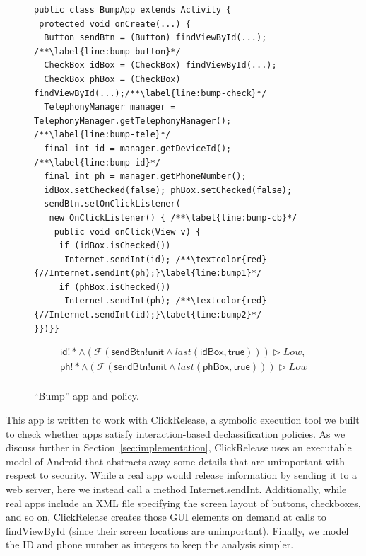 \documentclass{llncs}
\newcommand{\code}[1]{\textsf{#1}} %
\newcommand{\toolname}{ClickRelease\xspace}
\newcommand{\tfuture}{\mathcal{F}}
\newcommand{\tlast}[2]{\textit{last}(#1, #2)}
\begin{document}
\begin{figure}[t]
\centering
  \begin{lstlisting}[name=Ex]
public class BumpApp extends Activity {
 protected void onCreate(...) {
  Button sendBtn = (Button) findViewById(...); /**\label{line:bump-button}*/
  CheckBox idBox = (CheckBox) findViewById(...);
  CheckBox phBox = (CheckBox) findViewById(...);/**\label{line:bump-check}*/
  TelephonyManager manager = TelephonyManager.getTelephonyManager(); /**\label{line:bump-tele}*/
  final int id = manager.getDeviceId(); /**\label{line:bump-id}*/
  final int ph = manager.getPhoneNumber();
  idBox.setChecked(false); phBox.setChecked(false);
  sendBtn.setOnClickListener(
   new OnClickListener() { /**\label{line:bump-cb}*/
    public void onClick(View v) {
     if (idBox.isChecked())
      Internet.sendInt(id); /**\textcolor{red}{//Internet.sendInt(ph);}\label{line:bump1}*/
     if (phBox.isChecked())
      Internet.sendInt(ph); /**\textcolor{red}{//Internet.sendInt(id);}\label{line:bump2}*/
}})}}
  \end{lstlisting}
\begin{displaymath}
  \begin{array}{cc}
      \code{id}!\ast \wedge (\tfuture ( \code{sendBtn!unit} \land
      \tlast{\code{idBox}}{\code{true}})) \rhd Low, \\

      \code{ph}!\ast \wedge (\tfuture (
      \code{sendBtn!unit} \land
      \tlast{\code{phBox}}{\code{true}})) \rhd Low \\
    \end{array}
\end{displaymath}
\caption{``Bump'' app and policy.}
\label{fig:app-bump}
\end{figure}
 
This app is written to work with \toolname{}, a symbolic execution tool we built to check
whether apps satisfy interaction-based declassification policies. As we
discuss further in Section~\ref{sec:implementation}, \toolname{} uses an
executable model of Android that abstracts away some details that are
unimportant with respect to security. While a real app would release
information by sending it to a web server, here we instead call a
method \code{Internet.sendInt}. Additionally, while real apps
include an XML file specifying the screen layout of buttons,
checkboxes, and so on, \toolname{} creates those GUI elements
on demand at calls to \code{findViewById} (since their screen locations are
unimportant). Finally, we model the ID and phone number as
integers to keep the analysis simpler.
\end{document}

